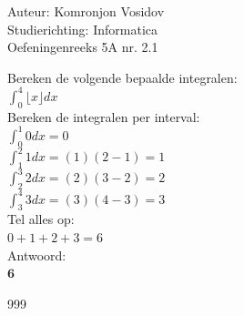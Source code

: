 \documentclass[a4paper]{article}
\newcommand{\dint}{\displaystyle\int}
\begin{document}
	
	\noindent \large Auteur: Komronjon Vosidov \\
	\noindent \large Studierichting: Informatica\\
	\noindent \large Oefeningenreeks 5A nr. 2.1\\
	
	\medskip
	
	\normalsize
    Bereken de volgende bepaalde integralen:\\
	
	$\dint_{0}^{4} \lfloor x \rfloor  dx$\\
		
	Bereken de integralen per interval:\\
	
	$\dint_{0}^{1} 0  dx = 0$\\
	
	$\dint_{1}^{2} 1  dx = (1)(2-1) = 1$\\
	
	$\dint_{2}^{3} 2  dx = (2)(3-2) = 2$\\
	
	$\dint_{3}^{4} 3  dx = (3)(4-3) = 3$\\
	
	Tel alles op:\\
	
	$0 + 1 + 2 + 3 = 6$\\
	
	Antwoord:\\
	
	$\mathbf{6}$\\
	
	
	
	
\begin{thebibliography}{999}
\end{thebibliography}		
\end{document}
